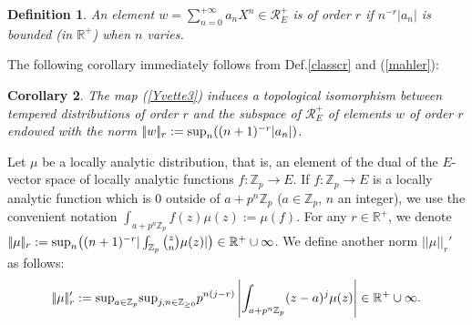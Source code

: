 \documentclass[11pt]{amsart}
\def\Z{{\mathbb Z}_p}
\newtheorem{definit}{\bf{Definition}}[subsection]
\newtheorem{cor}[definit]{\bf{Corollary}}
\begin{document}
\begin{definit} 
An element $w=\sum_{n=0}^{+\infty}a_nX^n\in {\mathcal R}_E^+$ is of
order $r$ if $n^{-r}|a_n|$ is bounded (in ${\mathbb R}^+$) when $n$
varies.  
\end{definit} 
 
The following corollary immediately follows from Def.\ref{classcr} and
(\ref{mahler}):  
 
\begin{cor}\label{reorderr} 
The map (\ref{Yvette3}) induces a topological isomorphism between
tempered distributions of order $r$ and the subspace of ${\mathcal
  R}_E^+$ of elements $w$ of order $r$ endowed with the norm
$|\!|w|\!|_r:={\rm sup}_n((n+1)^{-r}|a_n|)$.  
\end{cor} 
 
Let $\mu$ be a locally analytic distribution, that is, an element of
the dual of the $E$-vector space of locally analytic functions
$f:\Z\rightarrow E$. If $f:\Z\rightarrow E$ is a locally analytic
function which is $0$ outside of $a+p^n\Z$ ($a\in \Z$, $n$ an
integer), we use the convenient notation
$\int_{a+p^n\Z}f(z)\mu(z):=\mu(f)$. For any $r\in {\mathbb R}^+$, we
denote $|\!|\mu|\!|_r:={\rm sup}_n\big((n+1)^{-r}|\int_{\Z}{z\choose
  n}\mu(z)|\big)\in {\mathbb R}^+\cup \infty$. We define another norm
$|\!|\mu|\!|_r'$ as follows:  
$$|\!|\mu|\!|_r':={\rm sup}_{a\in\Z}{\rm sup}_{j,n\in{\mathbb Z}_{\geq
    0}}
p^{n(j-r)}\left|\int_{a+p^n\Z}(z-a)^j\mu(z)\right|\in {\mathbb
    R}^+\cup \infty.$$  
 
\end{document}
